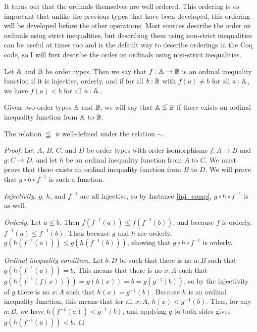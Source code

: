 \documentclass[../../math.tex]{subfiles}
\begin{document}
It turns out that the ordinals themselves are well ordered.  This ordering is so
important that unlike the previous types that have been developed, this ordering
will be developed before the other operations.  Most sources describe the order
on ordinals using strict inequalities, but describing them using non-strict
inequalities can be useful at times too and is the default way to describe
orderings in the Coq code, so I will first describe the order on ordinals using
non-strict inequalities.

\begin{definition}
    Let $\mathbb{A}$ and $\mathbb{B}$ be order types.  Then we say that $f : \mathbb{A} \to \mathbb{B}$ is an
    ordinal inequality function if it is injective, orderly, and if for all $b :
    \mathbb{B}$ with $f(a) \neq b$ for all $a : \mathbb{A}$, we have $f(a) < b$ for all $a :
    \mathbb{A}$.
\end{definition}

\begin{definition}
    Given two order types $\mathbb{A}$ and $\mathbb{B}$, we will say that $\mathbb{A} \leqq \mathbb{B}$ if there
    exists an ordinal inequality function from $\mathbb{A}$ to $\mathbb{B}$.
\end{definition}

\begin{lemma}
    The relation $\leqq$ is well-defined under the relation $\sim$.
\end{lemma}
\begin{proof}
    Let $A$, $B$, $C$, and $D$ be order types with order isomorphisms $f : A \to
    B$ and $g : C \to D$, and let $h$ be an ordinal inequality function from $A$
    to $C$.  We must prove that there exists an ordinal inequality function from
    $B$ to $D$.  We will prove that $g \circ h \circ f^{-1}$ is such a function.

    \noindent \textit{Injectivity.}
    $g$, $h$, and $f^{-1}$ are all injective, so by Instance \ref{inj_comp}, $g
    \circ h \circ f^{-1}$ is as well.

    \noindent \textit{Orderly.}
    Let $a \leq b$.  Then $f(f^{-1}(a)) \leq f(f^{-1}(b))$, and because $f$ is
    orderly, $f^{-1}(a) \leq f^{-1}(b)$.  Then because $g$ and $h$ are orderly,
    $g(h(f^{-1}(a))) \leq g(h(f^{-1}(b)))$, showing that $g \circ h \circ
    f^{-1}$ is orderly.

    \noindent \textit{Ordinal inequality condition.}
    Let $b : D$ be such that there is no $a : B$ such that $g(h(f^{-1}(a))) =
    b$.  This means that there is no $x : A$ such that $g(h(f^{-1}(f(x)))) =
    g(h(x)) = b = g(g^{-1}(b))$, so by the injectivity of $g$ there is no $x :
    A$ such that $h(x) = g^{-1}(b)$.  Because $h$ is an ordinal inequality
    function, this means that for all $x : A$, $h(x) < g^{-1}(b)$.  Thus, for
    any $a : B$, we have $h(f^{-1}(a)) < g^{-1}(b)$, and applying $g$ to both
    sides gives $g(h(f^{-1}(a))) < b$.
\end{proof}
\end{document}
